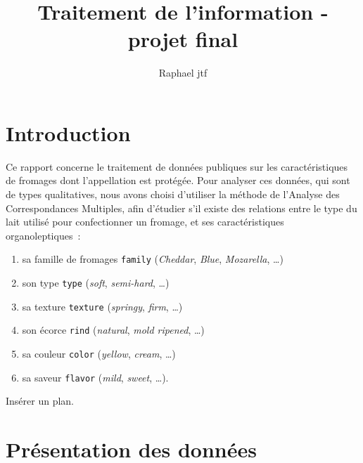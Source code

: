 \documentclass[12pt]{article}
\title{Traitement de l'information - projet final}
\author{Raphael jtf}
\date{}
\newcommand{\code}{\texttt}
\begin{document}
\maketitle

\newpage
\section{Introduction}
Ce rapport concerne le traitement de données publiques sur les caractéristiques de fromages\cite{1} dont l'appellation est protégée. Pour analyser ces données, qui sont de types qualitatives, nous avons choisi d’utiliser la méthode de l’Analyse des Correspondances Multiples\cite{3}, afin d’étudier s'il existe des relations entre le type du lait utilisé pour confectionner un fromage, et ses caractéristiques organoleptiques~:
\begin{enumerate}
    \item sa famille de fromages \code{family} (\textit{Cheddar}, \textit{Blue}, \textit{Mozarella}, \dots)
    \item son type \code{type} (\textit{soft}, \textit{semi-hard}, \dots)
    \item sa texture \code{texture} (\textit{springy}, \textit{firm}, \dots)
    \item son écorce \code{rind} (\textit{natural}, \textit{mold ripened}, \dots)
    \item sa couleur \code{color} (\textit{yellow}, \textit{cream}, \dots)
    \item sa saveur \code{flavor} (\textit{mild}, \textit{sweet}, \dots).
\end{enumerate}
Insérer un plan.

\section{Présentation des données}
\end{document}
